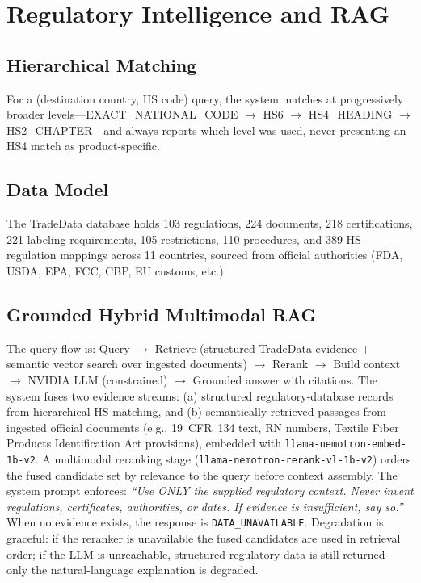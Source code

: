 \documentclass[conference]{IEEEtran}
\newcommand{\arrowto}{$\rightarrow$}
\begin{document}
\section{Regulatory Intelligence and RAG}

\subsection{Hierarchical Matching}
For a (destination country, HS code) query, the system matches at
progressively broader levels---EXACT\_NATIONAL\_CODE \arrowto{} HS6
\arrowto{} HS4\_HEADING \arrowto{} HS2\_CHAPTER---and always reports which
level was used, never presenting an HS4 match as product-specific.

\subsection{Data Model}
The TradeData database holds 103 regulations, 224 documents, 218
certifications, 221 labeling requirements, 105 restrictions, 110
procedures, and 389 HS-regulation mappings across 11 countries, sourced
from official authorities (FDA, USDA, EPA, FCC, CBP, EU customs, etc.).

\subsection{Grounded Hybrid Multimodal RAG}
The query flow is: Query \arrowto{} Retrieve (structured TradeData evidence
$+$ semantic vector search over ingested documents) \arrowto{} Rerank
\arrowto{} Build context \arrowto{} NVIDIA LLM (constrained) \arrowto{}
Grounded answer with citations. The system fuses two evidence streams: (a)
structured regulatory-database records from hierarchical HS matching, and
(b) semantically retrieved passages from ingested official documents
(e.g., 19~CFR~134 text, RN numbers, Textile Fiber Products Identification
Act provisions), embedded with \texttt{llama-nemotron-embed-1b-v2}. A
multimodal reranking stage \cite{nogueira2019}
(\texttt{llama-nemotron-rerank-vl-1b-v2})
orders the fused candidate set by relevance to the query before context
assembly. The system prompt enforces: \textit{``Use ONLY the supplied
regulatory context. Never invent regulations, certificates, authorities,
or dates. If evidence is insufficient, say so.''} When no evidence exists,
the response is \texttt{DATA\_UNAVAILABLE}. Degradation is graceful: if the
reranker is unavailable the fused candidates are used in retrieval order;
if the LLM is unreachable, structured regulatory data is still
returned---only the natural-language explanation is degraded.
\end{document}
